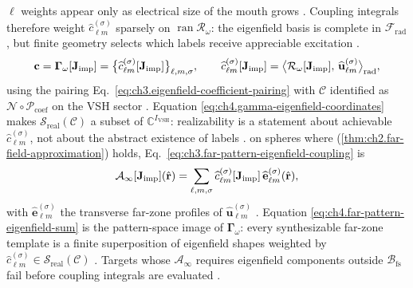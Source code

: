 $\ell$ weights appear only as electrical size of the mouth grows \cite{collin2001}.
Coupling integrals therefore weight $\widehat{c}_{\ell m}^{(\sigma)}$ sparsely on $\operatorname{ran}\mathcal{R}_\omega$:
the eigenfield basis is complete in $\mathcal{F}_{\mathrm{rad}}$, but finite geometry selects which labels receive
appreciable excitation \cite{stratton1941}.
\begin{equation}
\label{eq:ch4.gamma-eigenfield-coordinates}
\mathbf{c}
=
\boldsymbol{\Gamma}_\omega[\mathbf{J}_{\mathrm{imp}}]
=
\big\{
\widehat{c}_{\ell m}^{(\sigma)}[\mathbf{J}_{\mathrm{imp}}]
\big\}_{\ell,m,\sigma},
\qquad
\widehat{c}_{\ell m}^{(\sigma)}[\mathbf{J}_{\mathrm{imp}}]
=
\big\langle
\mathcal{R}_\omega[\mathbf{J}_{\mathrm{imp}}],\,
\widehat{\mathbf{u}}_{\ell m}^{(\sigma)}
\big\rangle_{\mathrm{rad}},
\end{equation}
using the pairing Eq.~\eqref{eq:ch3.eigenfield-coefficient-pairing} with \(\mathcal{C}\) identified as
\(\mathcal{N}\circ\mathcal{P}_{\mathrm{coef}}\) on the VSH sector \cite{hansen1988}. Equation
\eqref{eq:ch4.gamma-eigenfield-coordinates} makes \(\mathcal{S}_{\mathrm{real}}(\mathcal{C})\) a subset of
\(\mathbb{C}^{I_{\mathrm{VSH}}}\): realizability is a statement about achievable \(\widehat{c}_{\ell m}^{(\sigma)}\), not
about the abstract existence of labels \cite{devaney2004}.
on spheres where (\ref{thm:ch2.far-field-approximation}) holds,
Eq.~\eqref{eq:ch3.far-pattern-eigenfield-coupling} is
\begin{equation}
\label{eq:ch4.far-pattern-eigenfield-sum}
\mathcal{A}_{\infty}[\mathbf{J}_{\mathrm{imp}}](\hat{\mathbf{r}})
=
\sum_{\ell,m,\sigma}
\widehat{c}_{\ell m}^{(\sigma)}[\mathbf{J}_{\mathrm{imp}}]\,
\widehat{\mathbf{e}}_{\ell m}^{(\sigma)}(\hat{\mathbf{r}}),
\end{equation}
with \(\widehat{\mathbf{e}}_{\ell m}^{(\sigma)}\) the transverse far-zone profiles of
\(\widehat{\mathbf{u}}_{\ell m}^{(\sigma)}\) \cite{stratton1941}. Equation
\eqref{eq:ch4.far-pattern-eigenfield-sum} is the pattern-space image of
\(\boldsymbol{\Gamma}_\omega\): every synthesizable far-zone template is a finite superposition of eigenfield
shapes weighted by \(\widehat{c}_{\ell m}^{(\sigma)}\in\mathcal{S}_{\mathrm{real}}(\mathcal{C})\)
\cite{hansen1988}. Targets whose \(\mathcal{A}_{\infty}\) requires eigenfield components outside
\(\mathcal{B}_{\mathrm{fs}}\) fail before coupling integrals are evaluated \cite{devaney2004}.
